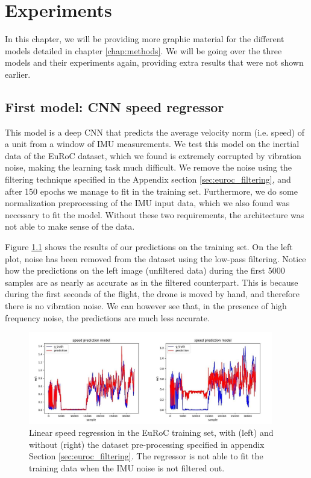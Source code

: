 \chapter{Experiments}\label{chap:experiments}

In this chapter, we will be providing more graphic material for the different models detailed in chapter \ref{chap:methods}.
We will be going over the three models and their experiments again, providing extra results that were not shown earlier.

\section{First model: CNN speed regressor}\label{sec:speed_regression_model}

This model is a deep CNN that predicts the average velocity norm (i.e. speed) of a unit from a window of IMU measurements. 
We test this model on the inertial data of the EuRoC dataset, which we found is extremely corrupted by vibration noise, making the learning task much difficult. 
We remove the noise using the filtering technique specified in the Appendix section \ref{sec:euroc_filtering}, and after 150 epochs we manage to fit in the training set.
Furthermore, we do some normalization preprocessing of the IMU input data, which we also found was necessary to fit the model.
Without these two requirements, the architecture was not able to make sense of the data.

Figure \ref{fig:speed_prediction_filtered_vs_unfiltered} shows the results of our predictions on the training set. 
On the left plot, noise has been removed from the dataset using the low-pass filtering. 
Notice how the predictions on the left image (unfiltered data) during the first 5000 samples are as nearly as accurate as in the filtered counterpart.
This is because during the first seconds of the flight, the drone is moved by hand, and therefore there is no vibration noise.
We can however see that, in the presence of high frequency noise, the predictions are much less accurate.

\begin{figure}[h]
   \centering
   \includegraphics[width=0.95\textwidth]{thesis_template/img/speed_prediction_filtered_vs_unfiltered.jpeg}
   \caption{Linear speed regression in the EuRoC training set, with (left) and without (right) the dataset pre-processing specified in appendix Section \ref{sec:euroc_filtering}.
   The regressor is not able to fit the training data when the IMU noise is not filtered out.}
   \label{fig:speed_prediction_filtered_vs_unfiltered}
\end{figure}

